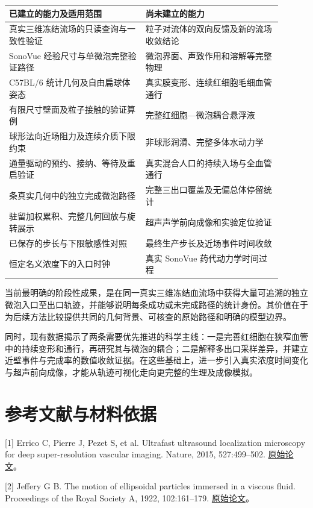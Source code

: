 \documentclass[UTF8,a4paper,11pt,fontset=fandol]{ctexart}
\begin{document}
{\small
\setlength{\tabcolsep}{4pt}
\begin{longtable}{>{\raggedright\arraybackslash}p{0.45\linewidth}>{\raggedright\arraybackslash}p{0.45\linewidth}}
\toprule
已建立的能力及适用范围 & 尚未建立的能力 \\
\midrule\endhead
真实三维冻结流场的只读查询与一致性验证 & 粒子对流体的双向反馈及新的流场收敛结论 \\
SonoVue 经验尺寸与单微泡完整验证路径 & 微泡界面、声致作用和溶解等完整物理 \\
C57BL/6 统计几何及自由扁球体姿态 & 真实膜变形、连续红细胞毛细血管通行 \\
有限尺寸壁面及粒子接触的验证算例 & 完整红细胞—微泡耦合悬浮液 \\
球形法向近场阻力及连续介质下限约束 & 非球形润滑、完整多体水动力学 \\
通量驱动的预约、接纳、等待及重启验证 & 真实混合人口的持续入场与全血管通行 \\
1249 条真实几何中的独立完成微泡路径 & 完整三出口覆盖及无偏总体停留统计 \\
驻留加权累积、完整几何回放与旋转展示 & 超声声学前向成像和实验定位验证 \\
已保存的步长与下限敏感性对照 & 最终生产步长及近场事件时间收敛 \\
恒定名义浓度下的入口时钟 & 真实 SonoVue 药代动力学时间过程 \\
\bottomrule
\end{longtable}
}

当前最明确的阶段性成果，是在同一真实三维冻结血流场中获得大量可追溯的独立微泡入口至出口轨迹，并能够说明每条成功或未完成路径的统计身份。其价值在于为后续方法比较提供共同的几何背景、可核查的原始路径和明确的模型边界。

同时，现有数据揭示了两条需要优先推进的科学主线：一是完善红细胞在狭窄血管中的持续变形和通行，再研究其与微泡的耦合；二是解释多出口采样差异，并建立近壁事件与完成率的数值收敛证据。在这些基础上，进一步引入真实浓度时间变化与超声前向成像，才能从轨迹可视化走向更完整的生理及成像模拟。

\section*{参考文献与材料依据}

[1] Errico C, Pierre J, Pezet S, et al. Ultrafast ultrasound localization microscopy for deep super-resolution vascular imaging. Nature, 2015, 527:499–502. \href{https://doi.org/10.1038/nature16066}{原始论文}。

[2] Jeffery G B. The motion of ellipsoidal particles immersed in a viscous fluid. Proceedings of the Royal Society A, 1922, 102:161–179. \href{https://doi.org/10.1098/rspa.1922.0078}{原始论文}。
\end{document}
